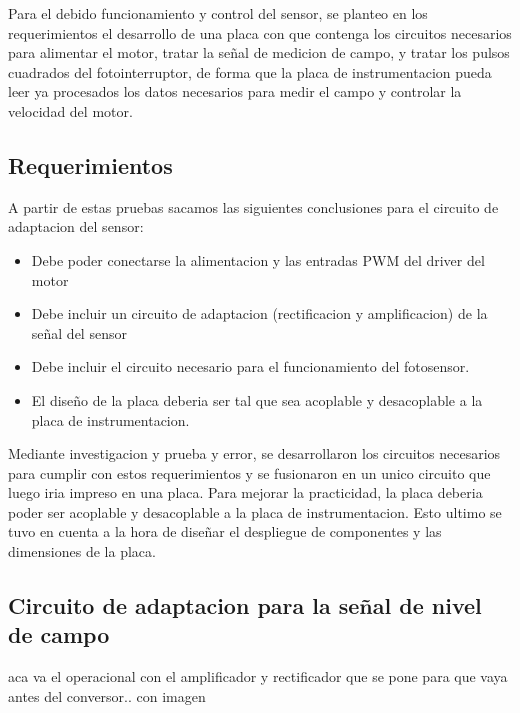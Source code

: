 Para el debido funcionamiento y control del sensor, se planteo en los requerimientos el desarrollo de una placa con que contenga los circuitos necesarios para alimentar el motor, tratar la señal de medicion de campo, y tratar los pulsos cuadrados del fotointerruptor, de forma que la placa de instrumentacion pueda leer ya procesados los datos necesarios para medir el campo y controlar la velocidad del motor.


\subsection{Requerimientos} %
\label{sub:requerimientos}

A partir de estas pruebas sacamos las siguientes conclusiones para el circuito de adaptacion del sensor:

\begin{itemize}
	\item Debe poder conectarse la alimentacion y las entradas PWM del driver del motor
	\item Debe incluir un circuito de adaptacion (rectificacion y amplificacion) de la señal del sensor
	\item Debe incluir el circuito necesario para el funcionamiento del fotosensor.
	\item El diseño de la placa deberia ser tal que sea acoplable y desacoplable a la placa de instrumentacion.
\end{itemize}

Mediante investigacion y prueba y error, se desarrollaron los circuitos necesarios para cumplir con estos requerimientos y se fusionaron en un unico circuito que luego iria impreso en una placa. Para mejorar la practicidad, la placa deberia poder ser acoplable y desacoplable a la placa de instrumentacion. Esto ultimo se tuvo en cuenta a la hora de diseñar el despliegue de componentes y las dimensiones de la placa.

\subsection{Circuito de adaptacion para la señal de nivel de campo} %
\label{sub:circuito_de_adaptacion_para_la_señal_de_nivel_de_campo}

aca va el operacional con el amplificador y rectificador que se pone para que vaya antes del conversor.. con imagen



